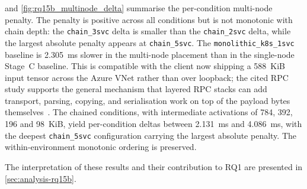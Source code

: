  and \cref{fig:rq15b_multinode_delta} summarise the
per-condition multi-node penalty. The penalty is positive across all
conditions but is not monotonic with chain depth: the
\texttt{chain\_3svc} delta is smaller than the \texttt{chain\_2svc} delta,
while the largest absolute penalty appears at \texttt{chain\_5svc}. The
\texttt{monolithic\_k8s\_1svc} baseline is 2.305~ms slower in the multi-node
placement than in the single-node Stage~C baseline. This is compatible with
the client now shipping a 588~KiB input tensor across the Azure VNet rather
than over loopback; the cited RPC study supports the general mechanism that
layered RPC stacks can add transport, parsing, copying, and serialisation
work on top of the payload bytes themselves~\cite{rpc_overhead_hotos25}.
The chained conditions, with intermediate activations of
784, 392, 196 and 98~KiB, yield per-condition deltas between 2.131~ms and
4.086~ms, with the deepest \texttt{chain\_5svc} configuration carrying the
largest absolute penalty. The within-environment monotonic ordering is
preserved.

The interpretation of these results and their contribution to RQ1 are presented in
\cref{sec:analysis-rq15b}.
